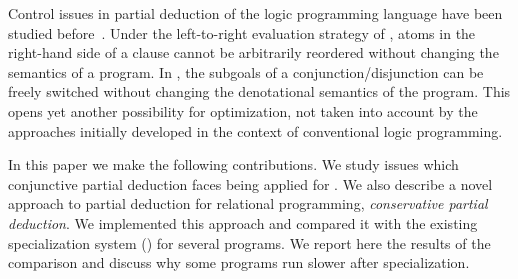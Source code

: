 Control issues in partial deduction of the logic programming language \pro have been studied before~\cite{leuschel2002logic}.
Under the left-to-right evaluation strategy of \pro, atoms in the right-hand side of a clause cannot be arbitrarily reordered without changing the semantics of a program.
In \mk, the subgoals of a conjunction/disjunction can be freely switched without changing the denotational semantics of the program.
This opens yet another possibility for optimization, not taken into account by the approaches initially developed in the context of conventional logic programming.

In this paper we make the following contributions.
We study issues which conjunctive partial deduction faces being applied for \mk.
We also describe a novel approach to partial deduction for relational programming, \emph{conservative partial deduction}.
We implemented this approach and compared it with the existing specialization system (\ecce) for several programs.
We report here the results of the comparison and discuss why some \mk programs run slower after specialization.
